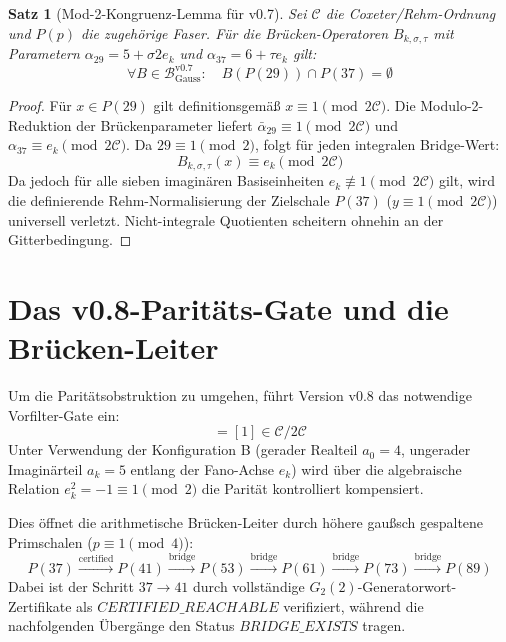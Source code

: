 \documentclass[11pt,a4paper]{article}
\newtheorem{theorem}{Satz}[section]
\begin{document}
	\begin{theorem}[Mod-2-Kongruenz-Lemma für v0.7]
		Sei $\mathcal{C}$ die Coxeter/Rehm-Ordnung und $P(p)$ die zugehörige Faser. Für die Brücken-Operatoren $B_{k,\sigma,\tau}$ mit Parametern $\alpha_{29} = 5 + \sigma 2e_k$ und $\alpha_{37} = 6 + \tau e_k$ gilt:
		\begin{equation}
			\forall B \in \mathcal{B}_{\text{Gauss}}^{\text{v0.7}}: \quad B(P(29)) \cap P(37) = \emptyset
		\end{equation}
	\end{theorem}
	\begin{proof}
		Für $x \in P(29)$ gilt definitionsgemäß $x \equiv 1 \pmod{2\mathcal{C}}$. Die Modulo-2-Reduktion der Brückenparameter liefert $\bar{\alpha}_{29} \equiv 1 \pmod{2\mathcal{C}}$ und $\alpha_{37} \equiv e_k \pmod{2\mathcal{C}}$. Da $29 \equiv 1 \pmod 2$, folgt für jeden integralen Bridge-Wert:
		\begin{equation}
			B_{k,\sigma,\tau}(x) \equiv e_k \pmod{2\mathcal{C}}
		\end{equation}
		Da jedoch für alle sieben imaginären Basiseinheiten $e_k \not\equiv 1 \pmod{2\mathcal{C}}$ gilt, wird die definierende Rehm-Normalisierung der Zielschale $P(37)$ ($y \equiv 1 \pmod{2\mathcal{C}}$) universell verletzt. Nicht-integrale Quotienten scheitern ohnehin an der Gitterbedingung.
	\end{proof}
	
	\section{Das v0.8-Paritäts-Gate und die Brücken-Leiter}
	
	Um die Paritätsobstruktion zu umgehen, führt Version v0.8 das notwendige Vorfilter-Gate ein:
	\begin{equation}
		[\bar{\alpha}\beta] = [1] \in \mathcal{C}/2\mathcal{C}
	\end{equation}
	Unter Verwendung der Konfiguration B (gerader Realteil $a_0 = 4$, ungerader Imaginärteil $a_k = 5$ entlang der Fano-Achse $e_k$) wird über die algebraische Relation $e_k^2 = -1 \equiv 1 \pmod 2$ die Parität kontrolliert kompensiert. 
	
	Dies öffnet die arithmetische Brücken-Leiter durch höhere gaußsch gespaltene Primschalen ($p \equiv 1 \pmod 4$):
	\begin{equation}
		P(37) \xrightarrow{\text{certified}} P(41) \xrightarrow{\text{bridge}} P(53) \xrightarrow{\text{bridge}} P(61) \xrightarrow{\text{bridge}} P(73) \xrightarrow{\text{bridge}} P(89)
	\end{equation}
	Dabei ist der Schritt $37 \to 41$ durch vollständige $G_2(2)$-Generatorwort-Zertifikate als $CERTIFIED\_REACHABLE$ verifiziert, während die nachfolgenden Übergänge den Status $BRIDGE\_EXISTS$ tragen.
	
\end{document}
